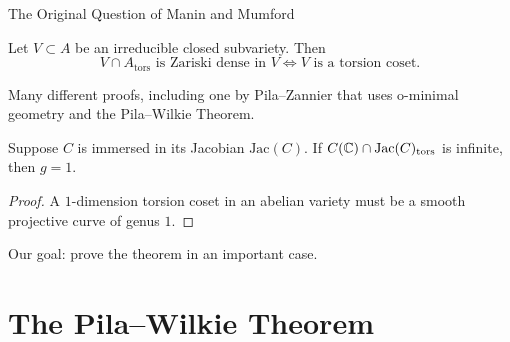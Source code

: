 \documentclass{beamer}
\begin{document}
\begin{frame}{The Original Question of Manin and Mumford}
  \begin{theorem}
    Let $V\subset A$ be an irreducible closed subvariety. Then
    \begin{equation*}
      V\cap A_{\mathrm{tors}} \text{ is Zariski dense in $V$}
      \Longleftrightarrow \text{$V$ is a torsion coset.}
    \end{equation*}
  \end{theorem}
  Many different proofs, including one by Pila--Zannier
  that uses \alert{o-minimal geometry} and the
    \alert{Pila--Wilkie Theorem}.

  \begin{corollary}
    Suppose
    $C$ is immersed in its Jacobian $\mathrm{Jac}(C)$. If $C({\mathbb{C}})\cap
    \mathrm{Jac}(C)_{\mathrm{tors}}$ is infinite, then $g=1$. 
  \end{corollary}
  \begin{proof}
    A $1$-dimension torsion coset in an abelian variety must be a
    smooth projective curve of genus $1$. 
  \end{proof}
  \vspace{-.25cm}
  
  Our goal: prove the theorem in an important case.
\end{frame}

\section{The Pila--Wilkie Theorem}
\end{document}
